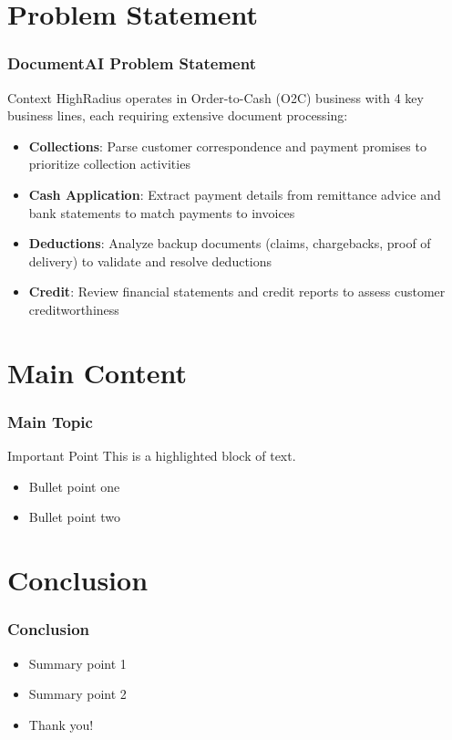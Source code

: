 \documentclass{beamer}
\begin{document}
\section{Problem Statement}

\begin{frame}
\frametitle{DocumentAI Problem Statement}
\begin{block}{Context}
HighRadius operates in Order-to-Cash (O2C) business with 4 key business lines, each requiring extensive document processing:
\end{block}

\begin{itemize}
    \item \textbf{Collections}: Parse customer correspondence and payment promises to prioritize collection activities
    \item \textbf{Cash Application}: Extract payment details from remittance advice and bank statements to match payments to invoices
    \item \textbf{Deductions}: Analyze backup documents (claims, chargebacks, proof of delivery) to validate and resolve deductions
    \item \textbf{Credit}: Review financial statements and credit reports to assess customer creditworthiness
\end{itemize}
\end{frame}

\section{Main Content}
\begin{frame}
\frametitle{Main Topic}
\begin{block}{Important Point}
This is a highlighted block of text.
\end{block}

\begin{itemize}
    \item Bullet point one
    \item Bullet point two
\end{itemize}
\end{frame}

\section{Conclusion}
\begin{frame}
\frametitle{Conclusion}
\begin{itemize}
    \item Summary point 1
    \item Summary point 2
    \item Thank you!
\end{itemize}
\end{frame}
\end{document}

